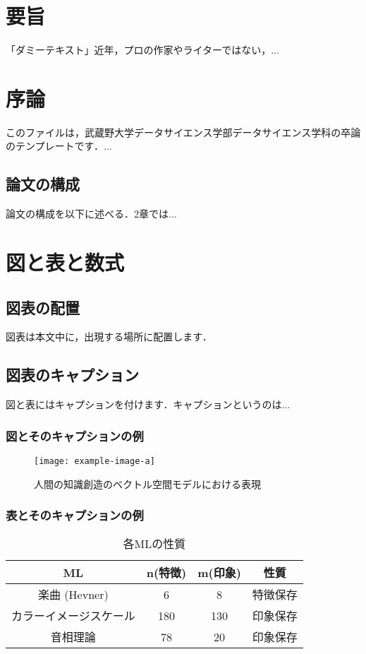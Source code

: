 \documentclass[titlepage,12pt]{ltjsarticle}
\title{卒業論文 \vskip\baselineskip タイトルタイトルタイトル}
\author{武蔵野太郎\\ データサイエンス学科\\ 武蔵野大学}
\date{2025年1月}
\begin{document}
\maketitle

\chapter*{要旨}
「ダミーテキスト」近年，プロの作家やライターではない，...

\tableofcontents

\chapter{序論}
このファイルは，武蔵野大学データサイエンス学部データサイエンス学科の卒論のテンプレートです．...

\section{論文の構成}
論文の構成を以下に述べる．2章では...

\chapter{図と表と数式}
\section{図表の配置}
図表は本文中に，出現する場所に配置します．

\section{図表のキャプション}
図と表にはキャプションを付けます．キャプションというのは...

\subsection{図とそのキャプションの例}
\begin{figure}[htbp]
    \centering
    \texttt{[image: example-image-a]}
    \caption{人間の知識創造のベクトル空間モデルにおける表現}
\end{figure}

\subsection{表とそのキャプションの例}
\begin{table}[htbp]
    \centering
    \begin{tabular}{|c|c|c|c|}
        \hline
        ML & n(特徴) & m(印象) & 性質 \\ \hline
        楽曲 (Hevner) & 6 & 8 & 特徴保存 \\ \hline
        カラーイメージスケール & 180 & 130 & 印象保存 \\ \hline
        音相理論 & 78 & 20 & 印象保存 \\ \hline
    \end{tabular}
    \caption{各MLの性質}
\end{table}
\end{document}
